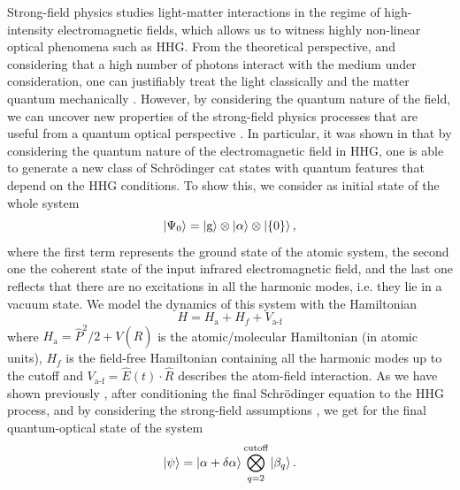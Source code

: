 Strong-field physics studies light-matter interactions in the regime of high-intensity electromagnetic fields, which allows us to witness highly non-linear optical phenomena such as HHG. From the theoretical perspective, and considering that a high number of photons interact with the medium under consideration, one can justifiably treat the light classically and the matter quantum mechanically \cite{Lewenstein1994}. However, by considering the quantum nature of the field, we can uncover new properties of the strong-field physics processes that are useful from a quantum optical perspective \cite{Kominis2014}. In particular, it was shown in \cite{Lewenstein2020} that by considering the quantum nature of the electromagnetic field in HHG, one is able to generate a new class of Schrödinger cat states with quantum features that depend on the HHG conditions. To show this, we consider as initial state of the whole system
\begin{equation}
    \ket{\Psi_0} = \ket{\text{g}} \otimes  \ket{\alpha} \otimes \ket{\{0\}},
\end{equation}
where the first term represents the ground state of the atomic system, the second one the coherent state of the input infrared electromagnetic field, and the last one reflects that there are no excitations in all the harmonic modes, i.e. they lie in a vacuum state. We model the dynamics of this system with the Hamiltonian
\begin{equation}
    H = H_\text{a} + H_f + V_\text{a-f}
\end{equation}
where $H_\text{a} = \hat{P}^2/2 + V(\hat{R})$ is the atomic/molecular Hamiltonian (in atomic units), $H_f$ is the field-free Hamiltonian containing all the harmonic modes up to the cutoff and $V_\text{a-f} = \hat{E}(t)\cdot \hat{R}$ describes the atom-field interaction. As we have shown previously \cite{Lewenstein2020}, after conditioning the final Schrödinger equation to the HHG process, and by considering the strong-field assumptions \cite{Lewenstein1994}, we get for the final quantum-optical state of the system \cite{Lewenstein2020}
\begin{equation}
    \ket{\psi} = \ket{\alpha + \delta \alpha} \bigotimes^\text{cutoff}_{q=2} \ket{\beta_q}.
\end{equation}

